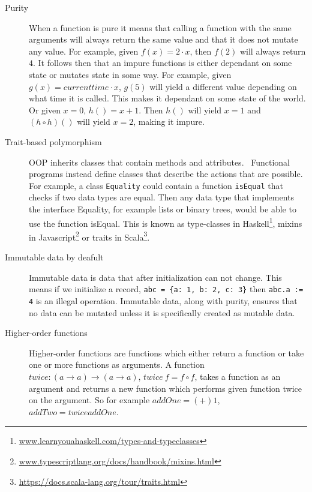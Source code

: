 \begin{description}
\item[ Purity ]

When a function is pure it means that calling a function with the same arguments
        will always return the same value and that it does not mutate any value.
        For example, given $f(x) = 2\cdot x$, then $f(2)$ will always
        return $4$. It follows then that an impure functions is either dependant
        on some state or mutates state in some way. For example, given $g(x) =
        currenttime \cdot x$, $g(5)$ will yield a different value depending on
        what time it is called. This makes it dependant on some state of the
        world. Or given $x=0$, $h()=x+1$. Then $h()$ will yield $x=1$ and $(h
        \circ h)()$ will yield $x=2$, making it impure.~\cite{wikipedia_pure}

	\item[ Trait-based polymorphism ]

		OOP inherits classes that contain methods and
attributes.~\cite{Gamma:1995:DPE:186897} Functional programs instead
define classes that describe the actions that are possible. For example, a
class \texttt{Equality} could contain a function \texttt{isEqual} that checks
if two data types are equal. Then any data type that implements the interface
Equality, for example lists or binary trees, would be able to use the function
isEqual.  This is known as type-classes in
Haskell\footnote{\url{www.learnyouahaskell.com/types-and-typeclasses}}, mixins
in Javascript\footnote{\url{www.typescriptlang.org/docs/handbook/mixins.html}}
or traits in Scala\footnote{\url{https://docs.scala-lang.org/tour/traits.html}}.

\item[ Immutable data by deafult ]

Immutable data is data that after initialization can not change. This means if
we initialize a record, \texttt{abc = \{a: 1, b: 2, c: 3\}} then \texttt{abc.a
:= 4} is an illegal operation. Immutable data, along with purity, ensures that
no data can be mutated unless it is specifically created as mutable data.

\item[Higher-order functions]

    Higher-order functions are functions which either return a function or take
    one or more functions as arguments. A function $twice :
    (a\rightarrow a)\rightarrow (a\rightarrow a)$, $twice\ f = f \circ f$, takes
    a function as an argument and returns a new function which performs given
    function twice on the argument. So for example $addOne = (+) 1$, $addTwo =
    twice addOne$.


\end{description}
